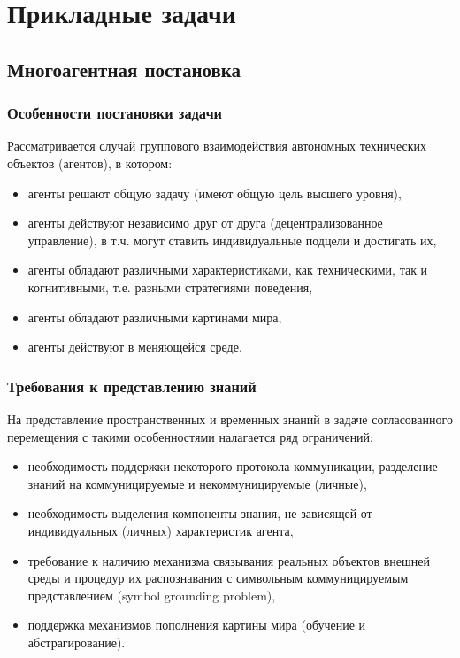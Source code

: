 	\section{Прикладные задачи}
	\subsection{Многоагентная постановка}
	\begin{frame}
		\frametitle{Особенности постановки задачи}
		
		Рассматривается случай группового взаимодействия автономных технических объектов (агентов), в котором:
		\begin{itemize}
			\item агенты решают общую задачу (имеют общую цель высшего уровня),
			\item агенты действуют независимо друг от друга (децентрализованное управление), в т.ч. могут ставить индивидуальные подцели и достигать их,
			\item агенты обладают различными характеристиками, как техническими, так и когнитивными, т.е. разными стратегиями поведения,
			\item агенты обладают различными картинами мира,
			\item агенты действуют в меняющейся среде.
		\end{itemize}
		
	\end{frame}
	
	\begin{frame}
		\frametitle{Требования к представлению знаний}
		
		На представление пространственных и временных знаний в задаче согласованного перемещения с такими особенностями налагается ряд ограничений:
		\begin{itemize}
			\item необходимость поддержки некоторого протокола коммуникации, разделение знаний на коммуницируемые и некоммуницируемые (личные),
			\item необходимость выделения компоненты знания, не зависящей от индивидуальных (личных) характеристик агента,
			\item требование к наличию механизма связывания реальных объектов внешней среды и процедур их распознавания с символьным коммуницируемым представлением (symbol grounding problem),
			\item поддержка механизмов пополнения картины мира (обучение и абстрагирование).
		\end{itemize}
	\end{frame}

